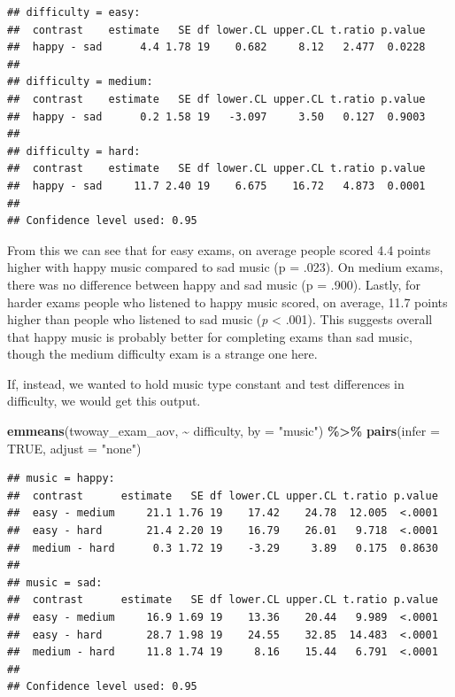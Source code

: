 \documentclass[
]{book}
\newenvironment{Shaded}{\begin{snugshade}}{\end{snugshade}}
\newcommand{\AttributeTok}[1]{\textcolor[rgb]{0.13,0.29,0.53}{#1}}
\newcommand{\ConstantTok}[1]{\textcolor[rgb]{0.56,0.35,0.01}{#1}}
\newcommand{\FunctionTok}[1]{\textcolor[rgb]{0.13,0.29,0.53}{\textbf{#1}}}
\newcommand{\NormalTok}[1]{#1}
\newcommand{\SpecialCharTok}[1]{\textcolor[rgb]{0.81,0.36,0.00}{\textbf{#1}}}
\newcommand{\StringTok}[1]{\textcolor[rgb]{0.31,0.60,0.02}{#1}}
\begin{document}
\begin{verbatim}
## difficulty = easy:
##  contrast    estimate   SE df lower.CL upper.CL t.ratio p.value
##  happy - sad      4.4 1.78 19    0.682     8.12   2.477  0.0228
## 
## difficulty = medium:
##  contrast    estimate   SE df lower.CL upper.CL t.ratio p.value
##  happy - sad      0.2 1.58 19   -3.097     3.50   0.127  0.9003
## 
## difficulty = hard:
##  contrast    estimate   SE df lower.CL upper.CL t.ratio p.value
##  happy - sad     11.7 2.40 19    6.675    16.72   4.873  0.0001
## 
## Confidence level used: 0.95
\end{verbatim}

From this we can see that for easy exams, on average people scored 4.4 points higher with happy music compared to sad music (p = .023). On medium exams, there was no difference between happy and sad music (p = .900). Lastly, for harder exams people who listened to happy music scored, on average, 11.7 points higher than people who listened to sad music (\emph{p} \textless{} .001). This suggests overall that happy music is probably better for completing exams than sad music, though the medium difficulty exam is a strange one here.

If, instead, we wanted to hold music type constant and test differences in difficulty, we would get this output.

\begin{Shaded}
\begin{Highlighting}[]
\FunctionTok{emmeans}\NormalTok{(twoway\_exam\_aov, }\SpecialCharTok{\textasciitilde{}}\NormalTok{ difficulty, }\AttributeTok{by =} \StringTok{"music"}\NormalTok{) }\SpecialCharTok{\%\textgreater{}\%}
  \FunctionTok{pairs}\NormalTok{(}\AttributeTok{infer =} \ConstantTok{TRUE}\NormalTok{, }\AttributeTok{adjust =} \StringTok{"none"}\NormalTok{)}
\end{Highlighting}
\end{Shaded}

\begin{verbatim}
## music = happy:
##  contrast      estimate   SE df lower.CL upper.CL t.ratio p.value
##  easy - medium     21.1 1.76 19    17.42    24.78  12.005  <.0001
##  easy - hard       21.4 2.20 19    16.79    26.01   9.718  <.0001
##  medium - hard      0.3 1.72 19    -3.29     3.89   0.175  0.8630
## 
## music = sad:
##  contrast      estimate   SE df lower.CL upper.CL t.ratio p.value
##  easy - medium     16.9 1.69 19    13.36    20.44   9.989  <.0001
##  easy - hard       28.7 1.98 19    24.55    32.85  14.483  <.0001
##  medium - hard     11.8 1.74 19     8.16    15.44   6.791  <.0001
## 
## Confidence level used: 0.95
\end{verbatim}
\end{document}
